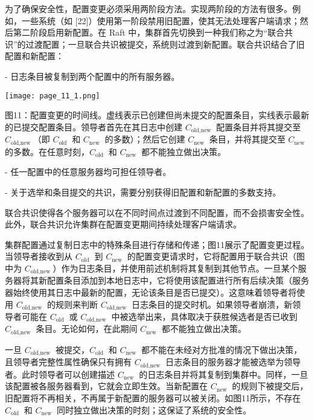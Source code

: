 \documentclass[12pt,a4paper]{report} %
\begin{document}
为了确保安全性，配置变更必须采用两阶段方法。实现两阶段的方法有很多。例如，一些系统（如 [22]）使用第一阶段禁用旧配置，使其无法处理客户端请求；然后第二阶段启用新配置。在 Raft 中，集群首先切换到一种我们称之为“联合共识”的过渡配置；一旦联合共识被提交，系统则过渡到新配置。联合共识结合了旧配置和新配置：

- 日志条目被复制到两个配置中的所有服务器。
\begin{center}
\texttt{[image: page\_11\_1.png]}
\end{center}
\begin{center} 图11：配置变更的时间线。虚线表示已创建但尚未提交的配置条目，实线表示最新的已提交配置条目。领导者首先在其日志中创建 $C_{\text {old,new }}$ 配置条目并将其提交至 $C_{\text {old,new }}$（即 $C_{\text {old }}$ 和 $C_{\text {new }}$ 的多数）；然后它创建 $C_{\text {new }}$ 条目，并将其提交至 $C_{\text {new }}$ 的多数。在任意时刻，$C_{\text {old }}$ 和 $C_{\text {new }}$ 都不能独立做出决策。
\end{center}

- 任一配置中的任意服务器均可担任领导者。

- 关于选举和条目提交的共识，需要分别获得旧配置和新配置的多数支持。

联合共识使得各个服务器可以在不同时间点过渡到不同配置，而不会损害安全性。此外，联合共识允许集群在配置变更期间持续处理客户端请求。

集群配置通过复制日志中的特殊条目进行存储和传递；图11展示了配置变更过程。当领导者接收到从 $C_{\text {old }}$ 到 $C_{\text {new }}$ 的配置变更请求时，它将配置用于联合共识（图中为 $C_{\text {old,new }}$）作为日志条目，并使用前述机制将其复制到其他节点。一旦某个服务器将其新配置条目添加到本地日志中，它将使用该配置进行所有后续决策（服务器始终使用其日志中最新的配置，无论该条目是否已提交）。这意味着领导者将使用 $C_{\text {old,new }}$ 的规则来判断 $C_{\text {old,new }}$ 日志条目的提交时机。如果领导者崩溃，新领导者可能在 $C_{\text {old }}$ 或 $C_{\text {old,new }}$ 中被选举出来，具体取决于获胜候选者是否已收到 $C_{\text {old,new }}$ 条目。无论如何，在此期间 $C_{\text {new }}$ 都不能独立做出决策。

一旦 $C_{\text {old,new }}$ 被提交，$C_{\text {old }}$ 和 $C_{\text {new }}$ 都不能在未经对方批准的情况下做出决策，且领导者完整性属性确保只有拥有 $C_{\text {old,new }}$ 日志条目的服务器才能被选举为领导者。此时领导者可以创建描述 $C_{\text {new }}$ 的日志条目并将其复制到集群中。同样，一旦该配置被各服务器看到，它就会立即生效。当新配置在 $C_{\text {new }}$ 的规则下被提交后，旧配置将不再相关，不再属于新配置的服务器可以被关闭。如图11所示，不存在 $C_{\text {old }}$ 和 $C_{\text {new }}$ 同时独立做出决策的时刻；这保证了系统的安全性。
\end{document}
